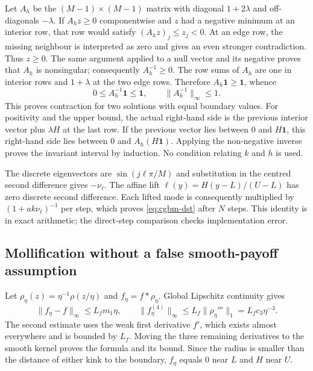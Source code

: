 \documentclass[11pt]{article}
\begin{document}
Let $A_h$ be the $(M-1)\times(M-1)$ matrix with diagonal
$1+2\lambda$ and off-diagonals $-\lambda$. If $A_h z\geq0$ componentwise
and $z$ had a negative minimum at an interior row, that row would satisfy
$(A_hz)_j\leq z_j<0$. At an edge row, the missing neighbour is interpreted
as zero and gives an even stronger contradiction. Thus $z\geq0$.
The same argument applied to a null vector and its negative proves that
$A_h$ is nonsingular; consequently $A_h^{-1}\geq0$. The row sums of
$A_h$ are one in interior rows and $1+\lambda$ at the two edge rows.
Therefore $A_h\mathbf 1\geq\mathbf 1$, whence
\begin{equation}
 0\leq A_h^{-1}\mathbf 1\leq\mathbf 1,
 \qquad \|A_h^{-1}\|_\infty\leq1.
 \label{eq:cgbm-mmatrix}
\end{equation}
This proves contraction for two solutions with equal boundary values.
For positivity and the upper bound, the actual right-hand side is the
previous interior vector plus $\lambda H$ at the last row. If the previous
vector lies between $0$ and $H\mathbf 1$, this right-hand side lies between
$0$ and $A_h(H\mathbf 1)$. Applying the non-negative inverse proves the
invariant interval by induction. No condition relating $k$ and $h$ is used.

The discrete eigenvectors are $\sin(j\ell\pi/M)$ and substitution in the
centred second difference gives $-\nu_\ell$. The affine lift
$\ell(y)=H(y-L)/(U-L)$ has zero discrete second difference. Each lifted
mode is consequently multiplied by $(1+ak\nu_\ell)^{-1}$ per step,
which proves \eqref{eq:cgbm-dst} after $N$ steps. This identity is in exact
arithmetic; the direct-step comparison checks implementation error.

\subsection{Mollification without a false smooth-payoff assumption}

Let $\rho_\eta(z)=\eta^{-1}\rho(z/\eta)$ and
$f_\eta=f*\rho_\eta$. Global Lipschitz continuity gives
\begin{equation}
 \|f_\eta-f\|_\infty\leq L_fm_1\eta,
 \qquad
 \|f_\eta^{(4)}\|_\infty
 \leq L_f\|\rho_\eta'''\|_1=L_f c_3\eta^{-3}.
 \label{eq:cgbm-mollifier-bounds}
\end{equation}
The second estimate uses the weak first derivative $f'$, which exists
almost everywhere and is bounded by $L_f$. Moving the three remaining
derivatives to the smooth kernel proves the formula and its bound.
Since the radius is smaller than the distance of either kink to the
boundary, $f_\eta$ equals $0$ near $L$ and $H$ near $U$.
\end{document}

